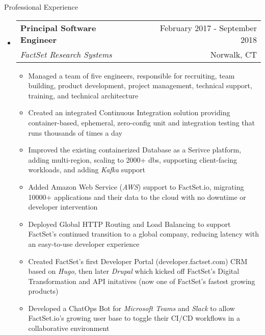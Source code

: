\documentclass[letterpaper,10pt]{article}
\makeatletter
\newenvironment{ressection}[1]{
	\vspace{4pt}
	{\fontfamily{phv}\selectfont\Large#1}
	\begin{itemize}
	\vspace{3pt}
}{
	\end{itemize}
}
\newcommand{\ressubitem}[1]{
	\vspace{-1pt}
	\item \begin{flushleft} #1 \end{flushleft}
}
\newcommand{\resbigitem}[4]{
	\vspace{-5pt}
	\item
	\begin{tabular*}{6in}{l@{\extracolsep{\fill}}r}
		\textbf{#1} & #2 \\
		\textit{#3} & #4\\
	\end{tabular*}
}
\newenvironment{ressubsec}[4]{
	\resbigitem{#1}{#2}{#3}{#4}
	\vspace{-2pt}
	\begin{itemize}
}{
	\end{itemize}
}
\makeatother
\begin{document}
\begin{ressection}{Professional Experience}
	\begin{ressubsec}{Principal Software Engineer}{February 2017 - September 2018}{FactSet Research Systems}{Norwalk, CT}
		\ressubitem{Managed a team of five engineers, responsible for recruiting, team building, product development, project management, technical support, training, and technical architecture}
		\ressubitem{Created an integrated Continuous Integration solution providing container-based, ephemeral, zero-config unit and integration testing that runs thousands of times a day}
		\ressubitem{Improved the existing containerized Database as a Serivce platform, adding multi-region, scaling to 2000+ dbs, supporting client-facing workloads, and adding \textit{Kafka} support}
		\ressubitem{Added Amazon Web Service (\textit{AWS}) support to FactSet.io, migrating 10000+ applications and their data to the cloud with no downtime or developer intervention}
		\ressubitem{Deployed Global HTTP Routing and Load Balancing to support FactSet's continued transition to a global company, reducing latency with an easy-to-use developer experience}
		\ressubitem{Created FactSet's first Developer Portal (developer.factset.com) CRM based on \textit{Hugo}, then later \textit{Drupal} which kicked off FactSet's Digital Transformation and API initatives (now one of FactSet's fastest growing products)}
		\ressubitem{Developed a ChatOps Bot for \textit{Microsoft Teams} and \textit{Slack} to allow FactSet.io's growing user base to toggle their CI/CD workflows in a collaborative environment}
	\end{ressubsec}


\end{ressection}
\end{document}
